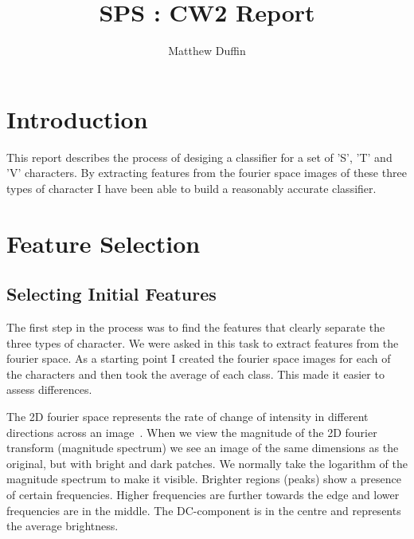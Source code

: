 \documentclass[11pt, a4paper]{article}
\title{SPS : CW2 Report}
\author{Matthew Duffin}
\begin{document}
\maketitle

\section{Introduction}
This report describes the process of desiging a classifier for a set of 'S', 'T' and 'V' characters. By extracting features from the fourier space images of these three types of character I have been able to build a reasonably accurate classifier. 

\section{Feature Selection}
\subsection{Selecting Initial Features}
The first step in the process was to find the features that clearly separate the three types of character. We were asked in this task to extract features from the fourier space. As a starting point I created the fourier space images for each of the characters and then took the average of each class. This made it easier to assess differences.

The 2D fourier space represents the rate of change of intensity in different directions across an image~\cite{slides}. When we view the magnitude of the 2D fourier transform (magnitude spectrum) we see an image of the same dimensions as the original, but with bright and dark patches. We normally take the logarithm of the magnitude spectrum to make it visible. Brighter regions (peaks) show a presence of certain frequencies. Higher frequencies are further towards the edge and lower frequencies are in the middle. The DC-component is in the centre and represents the average brightness.
\end{document}
